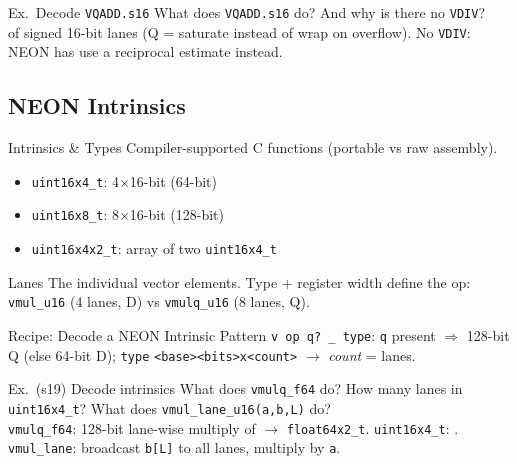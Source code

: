 \begin{example2}{Ex.\ Decode \texttt{VQADD.s16}}
    What does \texttt{VQADD.s16} do? And why is there no \texttt{VDIV}?
     \\ 
     of signed 16-bit lanes (Q = saturate instead of wrap on overflow). No \texttt{VDIV}: NEON has  use a reciprocal estimate instead.
\end{example2}

\subsection{NEON Intrinsics}


\begin{definition}{Intrinsics \& Types}
    Compiler-supported C functions (portable vs raw assembly).
    \begin{itemize}
        \item \texttt{uint16x4\_t}: 4$\times$16-bit (64-bit)
        \item \texttt{uint16x8\_t}: 8$\times$16-bit (128-bit)
        \item \texttt{uint16x4x2\_t}: array of two \texttt{uint16x4\_t}
    \end{itemize}
\end{definition}

\begin{concept}{Lanes}
    The individual vector elements. Type + register width define the op: \texttt{vmul\_u16} (4 lanes, D) vs \texttt{vmulq\_u16} (8 lanes, Q).
\end{concept}

\multend

\begin{KR}{Recipe: Decode a NEON Intrinsic}
    Pattern \texttt{v\,op\,q?\,\_\,type}: \texttt{q} present $\Rightarrow$ 128-bit Q (else 64-bit D); \texttt{type} \texttt{<base><bits>x<count>} $\to$ \emph{count} = lanes.
\end{KR}

\begin{example2}{Ex.\ (s19) Decode intrinsics}
    What does \texttt{vmulq\_f64} do? How many lanes in \texttt{uint16x4\_t}? What does \texttt{vmul\_lane\_u16(a,b,L)} do?
     \\ 
    \texttt{vmulq\_f64}: 128-bit lane-wise multiply of  $\to$ \texttt{float64x2\_t}. \texttt{uint16x4\_t}: . \texttt{vmul\_lane}: broadcast \texttt{b[L]} to all lanes, multiply by \texttt{a}.
\end{example2}

